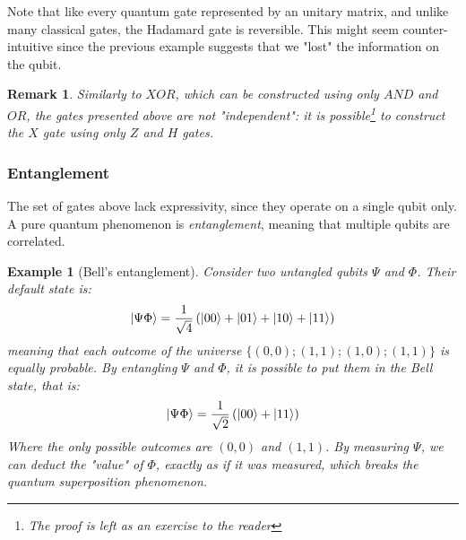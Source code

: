 \documentclass[12pt,a4paper]{article}
\theoremstyle{plain}
\newtheorem*{example}{Example}
\newtheorem*{remark}{Remark}
\theoremstyle{definition}
\DeclarePairedDelimiter\ket{\lvert}{\rangle}
\begin{document}
Note that like every quantum gate represented by an unitary matrix, and unlike many classical gates, the Hadamard gate is reversible. This might seem counter-intuitive since the previous example suggests that we "lost" the information on the qubit. 

\begin{remark}
    Similarly to $XOR$, which can be constructed using only $AND$ and $OR$, the gates presented above are not "independent": it is possible\footnote{The proof is left as an exercise to the reader} to construct the $X$ gate using only $Z$ and $H$ gates.
\end{remark}

\subsubsection{Entanglement}
The set of gates above lack expressivity, since they operate on a single qubit only. A pure quantum phenomenon is \emph{entanglement}, meaning that multiple qubits are correlated.

\begin{example}[Bell's entanglement]
    Consider two untangled qubits $\Psi$ and $\Phi$. Their default state is:
    \begin{equation*}
        \ket{\Psi\Phi} = \frac{1}{\sqrt{4}} \left(\ket{00}+\ket{01}+\ket{10}+\ket{11}\right)
    \end{equation*}
    meaning that each outcome of the universe $\{(0,0); (1,1); (1,0); (1,1)\}$ is equally probable. By entangling $\Psi$ and $\Phi$, it is possible to put them in the \emph{Bell state}, that is: 
    \begin{equation*}
        \ket{\Psi\Phi} = \frac{1}{\sqrt{2}} \left(\ket{00}+\ket{11}\right)
    \end{equation*}
    Where the only possible outcomes are $(0, 0)$ and $(1, 1)$. By measuring $\Psi$, we can deduct the "value" of $\Phi$, exactly as if it was measured, which breaks the quantum superposition phenomenon.
\end{example}
\end{document}
